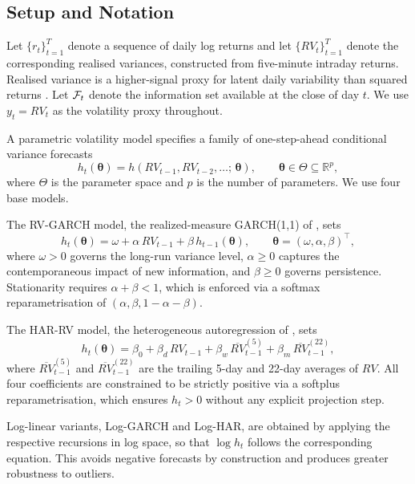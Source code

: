 \subsection{Setup and Notation}\label{sec:setup}

Let $\{r_t\}_{t=1}^T$ denote a sequence of daily log returns and let $\{RV_t\}_{t=1}^T$ denote the corresponding realised variances, constructed from five-minute intraday returns. Realised variance is a higher-signal proxy for latent daily variability than squared returns \citep{andersen2003modeling,liu2015does}. Let $\mathcal{F}_t$ denote the information set available at the close of day $t$. We use $y_t = RV_t$ as the volatility proxy throughout.

A parametric volatility model specifies a family of one-step-ahead conditional variance forecasts
\begin{equation}\label{eq:model}
    h_t(\boldsymbol{\theta}) = h(RV_{t-1}, RV_{t-2}, \ldots;\, \boldsymbol{\theta}), \qquad \boldsymbol{\theta} \in \Theta \subseteq \mathbb{R}^p,
\end{equation}
where $\Theta$ is the parameter space and $p$ is the number of parameters. We use four base models.

The RV-GARCH model, the realized-measure GARCH(1,1) of \citet{hansen2012realized}, sets
\[
    h_t(\boldsymbol{\theta}) = \omega + \alpha \, RV_{t-1} + \beta \, h_{t-1}(\boldsymbol{\theta}),
    \qquad \boldsymbol{\theta} = (\omega, \alpha, \beta)^\top,
\]
where $\omega > 0$ governs the long-run variance level, $\alpha \geq 0$ captures the contemporaneous impact of new information, and $\beta \geq 0$ governs persistence. Stationarity requires $\alpha + \beta < 1$, which is enforced via a softmax reparametrisation of $(\alpha, \beta, 1-\alpha-\beta)$.

The HAR-RV model, the heterogeneous autoregression of \citet{corsi2009simple}, sets
\[
    h_t(\boldsymbol{\theta}) = \beta_0 + \beta_d \, RV_{t-1} + \beta_w \, \overline{RV}_{t-1}^{(5)} + \beta_m \, \overline{RV}_{t-1}^{(22)},
\]
where $\overline{RV}_{t-1}^{(5)}$ and $\overline{RV}_{t-1}^{(22)}$ are the trailing 5-day and 22-day averages of $RV$. All four coefficients are constrained to be strictly positive via a softplus reparametrisation, which ensures $h_t > 0$ without any explicit projection step.

Log-linear variants, Log-GARCH and Log-HAR, are obtained by applying the respective recursions in log space, so that $\log h_t$ follows the corresponding equation. This avoids negative forecasts by construction and produces greater robustness to outliers.

